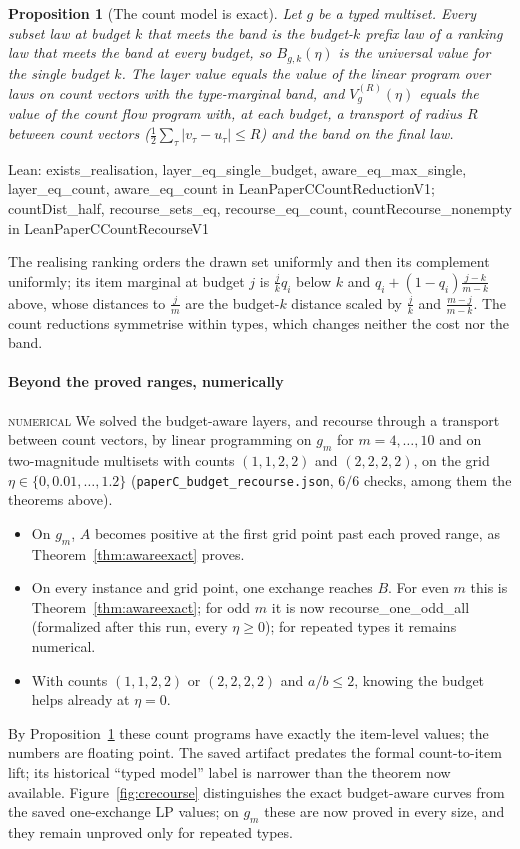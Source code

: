 \documentclass[conference]{IEEEtran}
\newtheorem{proposition}[theorem]{Proposition}
\theoremstyle{definition}
\newcommand{\lean}[1]{\textsf{\footnotesize #1}}
\newcommand{\leanbox}[1]{%
  \par\vspace{2pt}\noindent
  {\raggedright\footnotesize\textsf{Lean: #1}\par}\vspace{2pt}}
\newcommand{\NUM}{\textsc{numerical}}
\begin{document}
\begin{proposition}[The count model is exact]
\label{prop:countmodel}
Let $g$ be a typed multiset. Every subset law at budget $k$ that meets the band is the budget-$k$
prefix law of a ranking law that meets the band at every budget, so $B_{g,k}(\eta)$ is the universal
value for the single budget $k$. The layer value equals the value of the linear program over laws
on count vectors with the type-marginal band, and $V^{(R)}_g(\eta)$ equals the value of the count
flow program with, at each budget, a transport of radius $R$ between count vectors
($\frac12\sum_\tau|v_\tau-u_\tau|\le R$) and the band on the final law.
\end{proposition}
\leanbox{\lean{exists\_realisation}, \lean{layer\_eq\_single\_budget}, \lean{aware\_eq\_max\_single},
\lean{layer\_eq\_count}, \lean{aware\_eq\_count} in \lean{LeanPaperCCountReductionV1};
\lean{countDist\_half}, \lean{recourse\_sets\_eq}, \lean{recourse\_eq\_count},
\lean{countRecourse\_nonempty} in \lean{LeanPaperCCountRecourseV1}}

The realising ranking orders the drawn set uniformly and then its complement uniformly; its item
marginal at budget $j$ is $\frac jk q_i$ below $k$ and $q_i+(1-q_i)\frac{j-k}{m-k}$ above, whose
distances to $\frac jm$ are the budget-$k$ distance scaled by $\frac jk$ and $\frac{m-j}{m-k}$. The count
reductions symmetrise within types, which changes neither the cost nor the band.

\paragraph{Beyond the proved ranges, numerically} \NUM{} We solved the budget-aware layers, and
recourse through a transport between count vectors, by linear programming on $g_m$ for
$m=4,\dots,10$ and on two-magnitude multisets with counts $(1,1,2,2)$ and $(2,2,2,2)$, on the
grid $\eta\in\{0,0.01,\dots,1.2\}$ (\texttt{paperC\_budget\_recourse.json}, $6/6$ checks, among them the theorems above).
\begin{itemize}
\item On $g_m$, $A$ becomes positive at the first grid point past each proved range, as
Theorem~\ref{thm:awareexact} proves.
\item On every instance and grid point, one exchange reaches $B$. For even $m$ this is
Theorem~\ref{thm:awareexact}; for odd $m$ it is now \lean{recourse\_one\_odd\_all} (formalized after
this run, every $\eta\ge0$); for repeated types it remains numerical.
\item With counts $(1,1,2,2)$ or $(2,2,2,2)$ and $a/b\le2$, knowing the budget helps already at
$\eta=0$.
\end{itemize}
By Proposition~\ref{prop:countmodel} these count programs have exactly the item-level values;
the numbers are floating point. The saved artifact predates the formal count-to-item lift;
its historical ``typed model'' label is narrower than the theorem now available.
Figure~\ref{fig:crecourse} distinguishes the exact budget-aware curves from the saved
one-exchange LP values; on $g_m$ these are now proved in every size, and they remain unproved only for repeated types.
\end{document}
